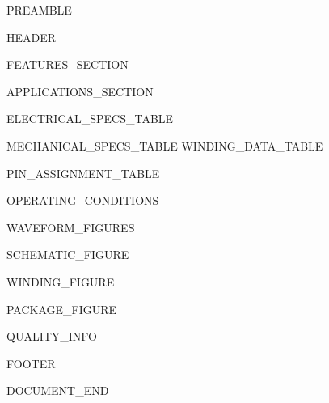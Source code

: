 %
%

{{PREAMBLE}}

{{HEADER}}

\begin{minipage}[t]{0.48\textwidth}
{{FEATURES_SECTION}}
\end{minipage}
\hfill
\begin{minipage}[t]{0.48\textwidth}
{{APPLICATIONS_SECTION}}
\end{minipage}
\vspace{5mm}

\begin{minipage}[t]{0.55\textwidth}
{{ELECTRICAL_SPECS_TABLE}}
\end{minipage}
\hfill
\begin{minipage}[t]{0.42\textwidth}
{{MECHANICAL_SPECS_TABLE}}
{{WINDING_DATA_TABLE}}
\end{minipage}
\vspace{5mm}

{{PIN_ASSIGNMENT_TABLE}}

{{OPERATING_CONDITIONS}}

{{WAVEFORM_FIGURES}}

\begin{minipage}[t]{0.32\textwidth}
{{SCHEMATIC_FIGURE}}
\end{minipage}
\hfill
\begin{minipage}[t]{0.32\textwidth}
{{WINDING_FIGURE}}
\end{minipage}
\hfill
\begin{minipage}[t]{0.32\textwidth}
{{PACKAGE_FIGURE}}
\end{minipage}
\vspace{5mm}

{{QUALITY_INFO}}

{{FOOTER}}

{{DOCUMENT_END}}
